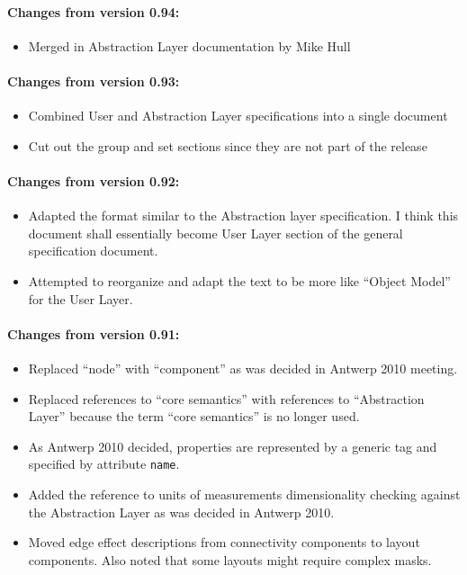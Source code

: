 \documentclass{article}
\begin{document}
\paragraph{Changes from version 0.94:}
\begin{itemize}
\item Merged in Abstraction Layer documentation by Mike Hull
\end{itemize}

\paragraph{Changes from version 0.93:}
\begin{itemize}
\item Combined User and Abstraction Layer specifications into a single document
\item Cut out the group and set sections since they are not part of the release
\end{itemize}

\paragraph{Changes from version 0.92:}
\begin{itemize}
\item Adapted the format similar to the Abstraction layer specification.
I think this document shall essentially become User Layer section of the
general specification document.
\item Attempted to reorganize and adapt the text to be more like ``Object
Model'' for the User Layer.
\end{itemize}

\paragraph{Changes from version 0.91:}
\begin{itemize}
\item Replaced ``node'' with ``component'' as was decided in Antwerp 2010
meeting.
\item Replaced references to ``core semantics'' with references to
``Abstraction Layer''
because the term ``core semantics'' is no longer used.
\item As Antwerp 2010 decided, properties are represented by a generic
tag and specified
by attribute {\tt name}.
\item Added the reference to units of measurements dimensionality checking
against
the Abstraction Layer as was decided in Antwerp 2010.
\item Moved edge effect descriptions from connectivity components to layout
components. Also
noted that some layouts might require complex masks.
\end{itemize}
\end{document}
